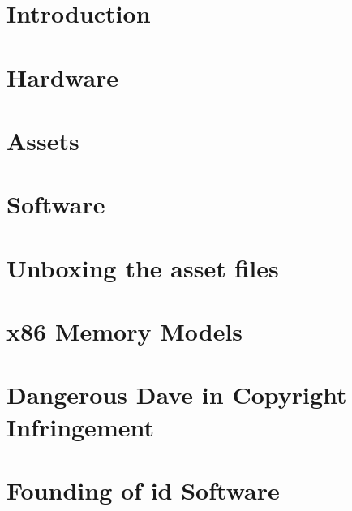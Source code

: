 \documentclass[8pt]{book}
\begin{document}
         

    \renewcommand{\rmdefault}{cmss} 
    \renewcommand{\familydefault}{\sfdefault}
    

    
    
    \cleardoublepage %
  

    \setcounter{secnumdepth}{3} %
    
    
    
    
    \tableofcontents
    
    \pagebreak

	\chapter{Introduction}
      
    
  
    \chapter{Hardware}
      
      
    \chapter{Assets}
      
      
    \chapter{Software}
       
       
       
       
       
       
       
       
    \appendix
    \appendixpage

	\chapter{Unboxing the asset files}
   		    
    
    \chapter{x86 Memory Models}
   		

	\chapter{Dangerous Dave in Copyright Infringement}
        
        
    \chapter{Founding of id Software}
        
  
    \cleartoleftpage
    \thispagestyle{plain} \blankpage
    \thispagestyle{plain} \blankpage
    \thispagestyle{plain} \blankpage
\end{document}
